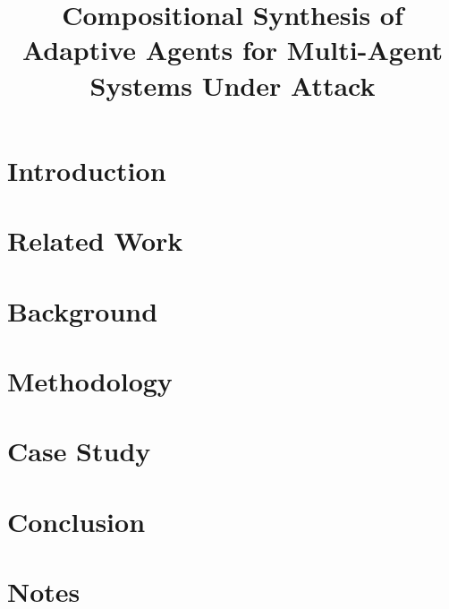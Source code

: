 \documentclass{llncs}
\begin{document}
\title{Compositional Synthesis of Adaptive Agents for Multi-Agent Systems Under Attack}



\author{} %





\maketitle
\iffalse
\begin{abstract}


\end{abstract}
\fi


\section{Introduction} \label{sec:intro}



\section{Related Work} \label{sec:related}


\section{Background} \label{sec:attack}



\section{Methodology} \label{sec:method}


\section{Case Study} \label{sec:demo}



\section{Conclusion} \label{sec:conclude}


\section{Notes}\label{sec:notes}

%



\pagebreak


\end{document}
